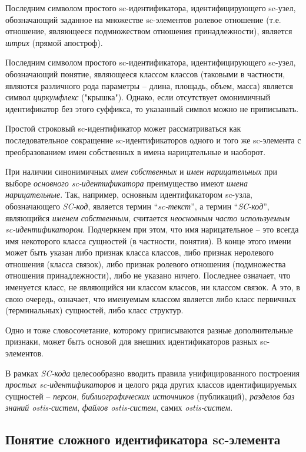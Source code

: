 Последним символом простого sc-идентификатора, идентифицирующего sc-узел, обозначающий заданное на множестве sc-элементов ролевое отношение (т.е. отношение, являющееся подмножеством отношения принадлежности), является \textit{штрих} (прямой апостроф).

Последним символом простого sc-идентификатора, идентифицирующего sc-узел, обозначающий понятие, являющееся классом классов (таковыми в частности, являются различного рода параметры -- длина, площадь, объем, масса) является символ \textit{циркумфлекс} ("крышка"{}). Однако, если отсутствует омонимичный идентификатор без этого суффикса, то указанный символ можно не приписывать.

Простой строковый sc-идентификатор может рассматриваться как последовательное сокращение sc-идентификаторов одного и того же sc-элемента с преобразованием имен собственных в имена нарицательные и наоборот.

При наличии синонимичных \textit{имен собственных} и \textit{имен нарицательных} при выборе \textit{основного sc-идентификатора} преимущество имеют \textit{имена нарицательные}. Так, например, основным идентификатором sc-узла, обозначающего \textit{SC-код}, является термин ``\textit{sc-текст}'', а термин ``\textit{SC-код}'', являющийся \textit{именем собственным}, считается \textit{неосновным часто используемым sc-идентификатором}. Подчеркнем при этом, что имя нарицательное -- это всегда имя некоторого класса сущностей (в частности, понятия). В конце этого имени может быть указан либо признак класса классов, либо признак неролевого отношения (класса связок), либо признак ролевого отношения (подмножества отношения принадлежности), либо не указано ничего. Последнее означает, что именуется класс, не являющийся ни классом классов, ни классом связок. А это, в свою очередь, означает, что именуемым классом является либо класс первичных (терминальных) сущностей, либо класс структур.

Одно и тоже словосочетание, которому приписываются разные дополнительные признаки, может быть основой для внешних идентификаторов разных sc-элементов.

В рамках \textit{SC-кода} целесообразно вводить правила унифицированного построения \textit{простых sc-идентификаторов} и целого ряда других классов идентифицируемых сущностей -- \textit{персон}, \textit{библиографических источников} (публикаций), \textit{разделов баз знаний ostis-систем}, \textit{файлов ostis-систем}, самих \textit{ostis-систем}.


\subsection{Понятие сложного идентификатора sc-элемента}

